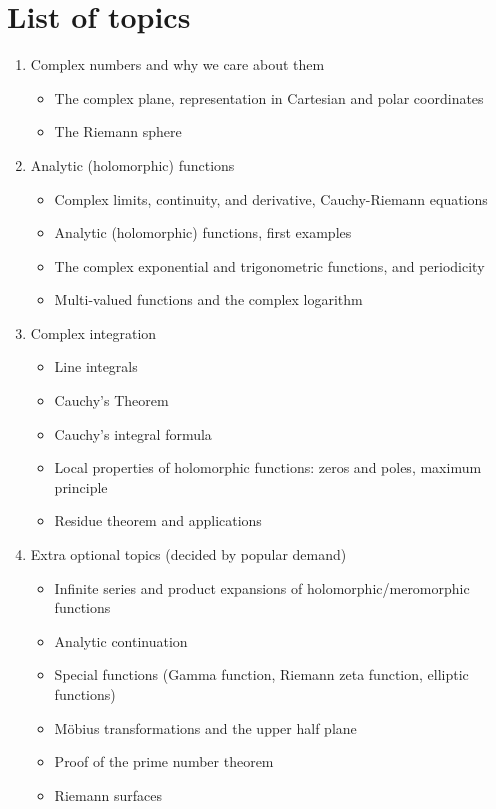 \documentclass[11pt,oneside]{amsart}
\begin{document}
\section{List of topics}
\begin{enumerate}
    \item Complex numbers and why we care about them
    \begin{itemize}
      \item The complex plane, representation in Cartesian and polar coordinates
      \item The Riemann sphere
    \end{itemize}
    \item Analytic (holomorphic) functions
    \begin{itemize}
      \item Complex limits, continuity, and derivative, Cauchy-Riemann equations
      \item Analytic (holomorphic) functions, first examples
      \item The complex exponential and trigonometric functions, and periodicity
      \item Multi-valued functions and the complex logarithm
    \end{itemize}
    \item Complex integration
    \begin{itemize}
      \item Line integrals
      \item Cauchy's Theorem
      \item Cauchy's integral formula
      \item Local properties of holomorphic functions: zeros and poles, maximum principle
      \item Residue theorem and applications
    \end{itemize}
    \item Extra optional topics (decided by popular demand)
    \begin{itemize}
      \item Infinite series and product expansions of holomorphic/meromorphic functions
      \item Analytic continuation
      \item Special functions (Gamma function, Riemann zeta function, elliptic functions)
      \item Möbius transformations and the upper half plane
      \item Proof of the prime number theorem
      \item Riemann surfaces
    \end{itemize}
\end{enumerate}
\end{document}
